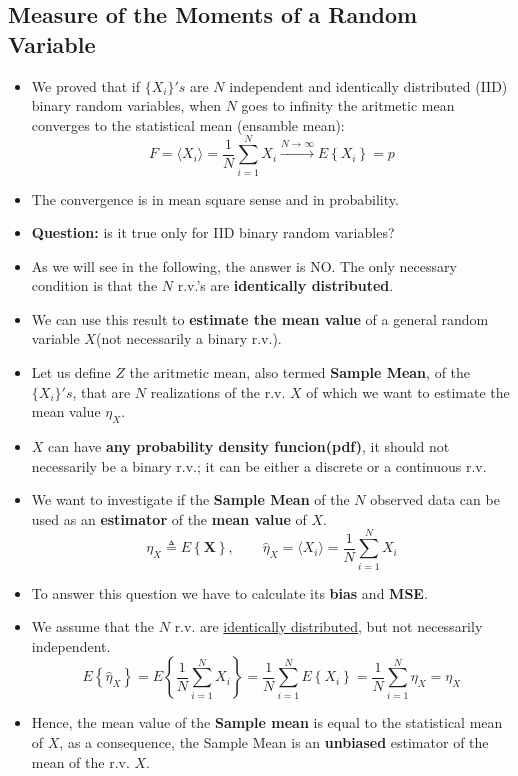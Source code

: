 \subsection{Measure of the Moments of a Random Variable}
\begin{itemize}
    \item We proved that if \(\{X_i\}'s\) are \(N\) independent and identically distributed (IID) binary random variables, when \(N\) goes to infinity the aritmetic mean converges to the statistical mean (ensamble mean):
    \[
F = \langle X_i \rangle = \frac{1}{N} \sum_{i=1}^{N} X_i 
\overset{N \to \infty}{\longrightarrow} 
E\left\{ X_i \right\} = p
\]
    \item The convergence is in mean square sense and in probability.
    \item \textbf{Question:} is it true only for IID binary random variables?
    \item As we will see in the following, the answer is NO. The only necessary condition is that the \(N\) r.v.'s are \textbf{identically distributed}.
    \item We can use this result to \textbf{estimate the mean value} of a general random variable \(X\)(not necessarily a binary r.v.).
    \item Let us define \(Z\) the aritmetic mean, also termed \textbf{Sample Mean}, of the \(\{X_i\}'s\), that are \(N\) realizations of the r.v. \(X\) of which we want to estimate the mean value \(\eta_X\).
    \item \(X\) can have \textbf{any probability density funcion(pdf)}, it should not necessarily be a binary r.v.; it can be either a discrete or a continuous r.v.
    \item We want to investigate if the \textbf{Sample Mean} of the \(N\) observed data can be used as an \textbf{estimator} of the \textbf{mean value} of \(X\).
    \[
\eta_X \triangleq E\left\{ \mathbf{X} \right\}, \qquad
\hat{\eta}_X = \langle X_i \rangle = \frac{1}{N} \sum_{i=1}^{N} X_i
\]
   \item To answer this question we have to calculate its \textbf{bias} and \textbf{MSE}.
   \item We assume that the \(N\) r.v. are \underline{identically distributed}, but not necessarily independent.
   \[
E\left\{\hat{\eta}_X\right\} = E\left\{ \frac{1}{N} \sum_{i=1}^{N} X_i \right\}
= \frac{1}{N} \sum_{i=1}^{N} E\left\{ X_i \right\}
= \frac{1}{N} \sum_{i=1}^{N} \eta_X = \eta_X
\]
   \item Hence, the mean value of the \textbf{Sample mean} is equal to the statistical mean of \(X\), as a consequence, the Sample Mean is an \textbf{unbiased} estimator of the mean of the r.v. \(X\).

\end{itemize}
